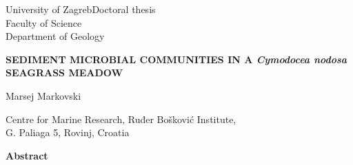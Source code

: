 \documentclass[
  12 pt,
]{book}
\begin{document}
{

    \singlespacing

        {
        
            \setlength{\parindent}{0pt}
    

University of Zagreb\hfill Doctoral thesis\\
Faculty of Science\\
Department of Geology

        
        }

    \bigskip

    {\Centering

\textbf{SEDIMENT MICROBIAL COMMUNITIES IN A \emph{Cymodocea nodosa} SEAGRASS MEADOW}

\bigskip

Marsej Markovski

Centre for Marine Research, Ruđer Bošković Institute,\\
G. Paliaga 5, Rovinj, Croatia

\bigskip

\textbf{Abstract}

    
    }
    

}
\end{document}
